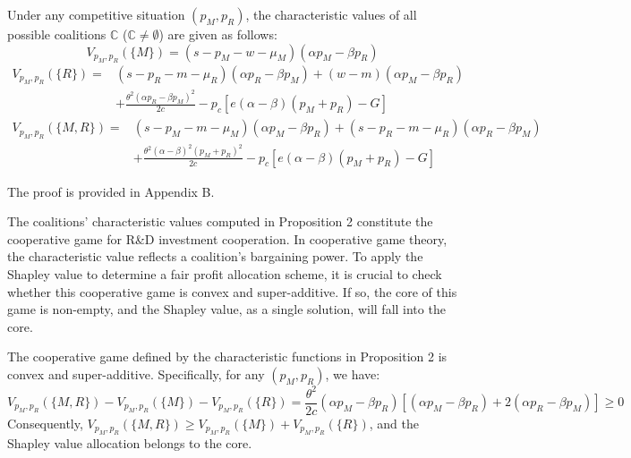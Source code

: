 \documentclass[authoryear,preprint,review,times,10pt]{elsarticle}
\begin{document}
\begin{prop}
\label{prop:characteristic}
Under any competitive situation $(p_M, p_R)$, the characteristic values of all possible coalitions $\mathbb{C}$ ($\mathbb{C} \neq \emptyset$) are given as follows:
\begin{equation}
V_{p_M,p_R}(\{M\}) = (s - p_M - w - \mu_M)(\alpha p_M - \beta p_R)
\end{equation}
\begin{equation}
\begin{aligned}
V_{p_M,p_R}(\{R\}) =& (s - p_R - m - \mu_R)(\alpha p_R - \beta p_M) + (w - m)(\alpha p_M - \beta p_R) \\
&+ \frac{\theta^2(\alpha p_R - \beta p_M)^2}{2c} - p_c[e(\alpha - \beta)(p_M + p_R) - G]
\end{aligned}
\end{equation}
\begin{equation}
\begin{aligned}
V_{p_M,p_R}(\{M,R\}) =& (s - p_M - m - \mu_M)(\alpha p_M - \beta p_R) + (s - p_R - m - \mu_R)(\alpha p_R - \beta p_M) \\
&+ \frac{\theta^2(\alpha - \beta)^2(p_M + p_R)^2}{2c} - p_c[e(\alpha - \beta)(p_M + p_R) - G]
\end{aligned}
\end{equation}
\end{prop}

 The proof is provided in Appendix B.

The coalitions' characteristic values computed in Proposition 2 constitute the cooperative game for R\&D investment cooperation. In cooperative game theory, the characteristic value reflects a coalition's bargaining power. To apply the Shapley value to determine a fair profit allocation scheme, it is crucial to check whether this cooperative game is convex and super-additive. If so, the core of this game is non-empty, and the Shapley value, as a single solution, will fall into the core.

\begin{prop}
\label{prop:convexity}
The cooperative game defined by the characteristic functions in Proposition 2 is convex and super-additive. Specifically, for any $(p_M, p_R)$, we have:
\begin{equation}
V_{p_M,p_R}(\{M,R\}) - V_{p_M,p_R}(\{M\}) - V_{p_M,p_R}(\{R\}) = \frac{\theta^2}{2c}(\alpha p_M - \beta p_R)[(\alpha p_M - \beta p_R) + 2(\alpha p_R - \beta p_M)] \geq 0
\end{equation}
Consequently, $V_{p_M,p_R}(\{M,R\}) \geq V_{p_M,p_R}(\{M\}) + V_{p_M,p_R}(\{R\})$, and the Shapley value allocation belongs to the core.
\end{prop}
\end{document}
